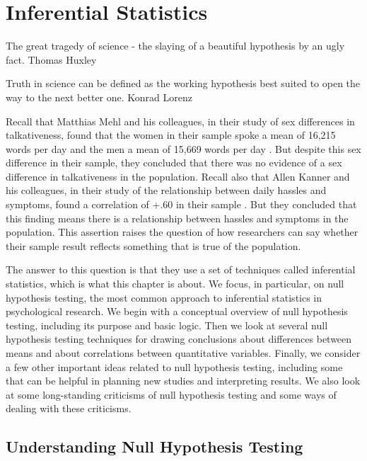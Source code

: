 \chapter{Inferential Statistics}

The great tragedy of science - the slaying of a beautiful hypothesis by an ugly fact.
Thomas Huxley

Truth in science can be defined as the working hypothesis best suited to open the way to the next better one.
Konrad Lorenz

Recall that Matthias Mehl and his colleagues, in their study of sex differences in talkativeness, found that the women in their sample spoke a mean of 16,215 words per day and the men a mean of 15,669 words per day \citep{mehl_are_2007}. But despite this sex difference in their sample, they concluded that there was no evidence of a sex difference in talkativeness in the population. Recall also that Allen Kanner and his colleagues, in their study of the relationship between daily hassles and symptoms, found a correlation of +.60 in their sample \citep{kanner_comparison_1981}. But they concluded that this finding means there is a relationship between hassles and symptoms in the population. This assertion raises the question of how researchers can say whether their sample result reflects something that is true of the population.


The answer to this question is that they use a set of techniques called inferential statistics, which is what this chapter is about. We focus, in particular, on null hypothesis testing, the most common approach to inferential statistics in psychological research. We begin with a conceptual overview of null hypothesis testing, including its purpose and basic logic. Then we look at several null hypothesis testing techniques for drawing conclusions about differences between means and about correlations between quantitative variables. Finally, we consider a few other important ideas related to null hypothesis testing, including some that can be helpful in planning new studies and interpreting results. We also look at some long-standing criticisms of null hypothesis testing and some ways of dealing with these criticisms.


\section{Understanding Null Hypothesis Testing}


